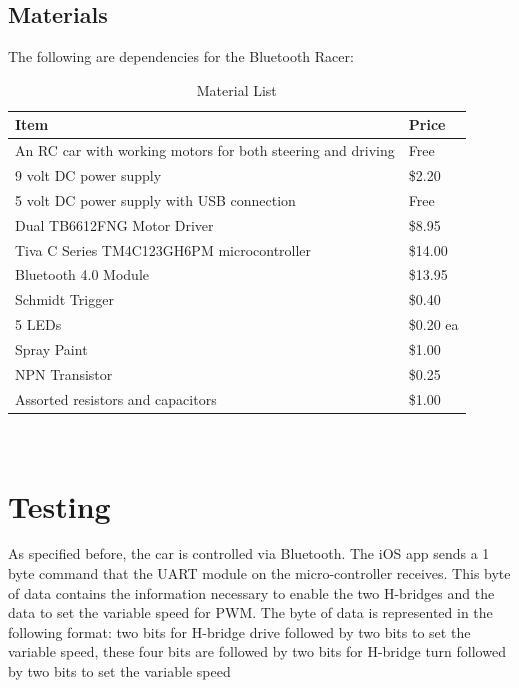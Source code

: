 \documentclass[12pt]{article}
\begin{document}
\subsection{Materials}
The following are dependencies for the Bluetooth Racer:
\begin{table}[H]
\centering
\caption{Material List}
\begin{tabular}{ll}\\
\hline
Item                                                        & Price     \\ \hline
An RC car with working motors for both steering and driving & Free      \\ \hline
9 volt DC power supply                                      & \$2.20    \\ \hline
5 volt DC power supply with USB connection                  & Free      \\ \hline
Dual TB6612FNG Motor Driver                                 & \$8.95    \\ \hline
Tiva C Series TM4C123GH6PM microcontroller                  & \$14.00   \\ \hline
Bluetooth 4.0 Module                                        & \$13.95   \\ \hline
Schmidt Trigger                                             & \$0.40    \\ \hline
5 LEDs                                                      & \$0.20 ea \\ \hline
Spray Paint                                                 & \$1.00    \\ \hline
NPN Transistor                                              & \$0.25    \\ \hline
Assorted resistors and capacitors                           & \$1.00    \\ \hline
\end{tabular}\\
\end{table}



\section{Testing}
As specified before, the car is controlled via Bluetooth. The iOS app sends a 1 byte command that the UART module on the micro-controller receives. This byte of data contains the information necessary to enable the two H-bridges and the data to set the variable speed for PWM. The byte of data is represented in the following format: two bits for H-bridge drive followed by two bits to set the variable speed, these four bits are followed by two bits for H-bridge turn followed by two bits to set the variable speed\\
\end{document}
